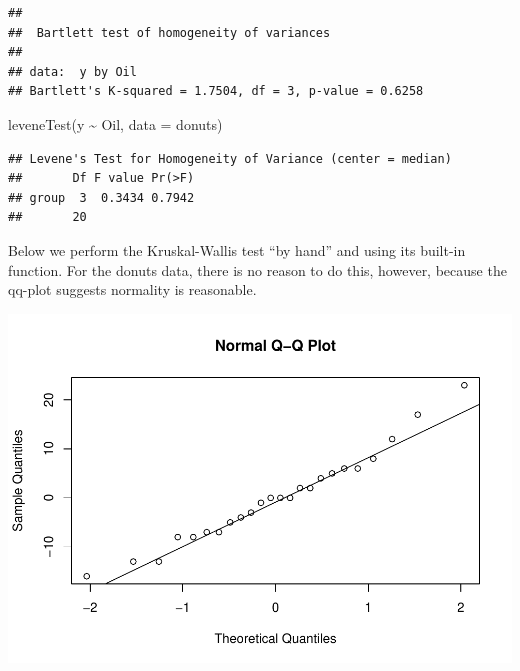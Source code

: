 \documentclass[
]{book}
\newenvironment{Shaded}{\begin{snugshade}}{\end{snugshade}}
\newcommand{\AttributeTok}[1]{\textcolor[rgb]{0.77,0.63,0.00}{#1}}
\newcommand{\FunctionTok}[1]{\textcolor[rgb]{0.00,0.00,0.00}{#1}}
\newcommand{\NormalTok}[1]{#1}
\newcommand{\SpecialCharTok}[1]{\textcolor[rgb]{0.00,0.00,0.00}{#1}}
\begin{document}
\begin{verbatim}
## 
##  Bartlett test of homogeneity of variances
## 
## data:  y by Oil
## Bartlett's K-squared = 1.7504, df = 3, p-value = 0.6258
\end{verbatim}

\begin{Shaded}
\begin{Highlighting}[]
\FunctionTok{leveneTest}\NormalTok{(y }\SpecialCharTok{\textasciitilde{}}\NormalTok{ Oil, }\AttributeTok{data =}\NormalTok{ donuts)}
\end{Highlighting}
\end{Shaded}

\begin{verbatim}
## Levene's Test for Homogeneity of Variance (center = median)
##       Df F value Pr(>F)
## group  3  0.3434 0.7942
##       20
\end{verbatim}

Below we perform the Kruskal-Wallis test ``by hand'' and using its built-in function. For the donuts data, there is no reason to do this, however, because the qq-plot suggests normality is reasonable.

\begin{Shaded}
\end{Shaded}

\includegraphics{05-OneWayANOVA_files/figure-latex/unnamed-chunk-11-1.pdf}
\end{document}
